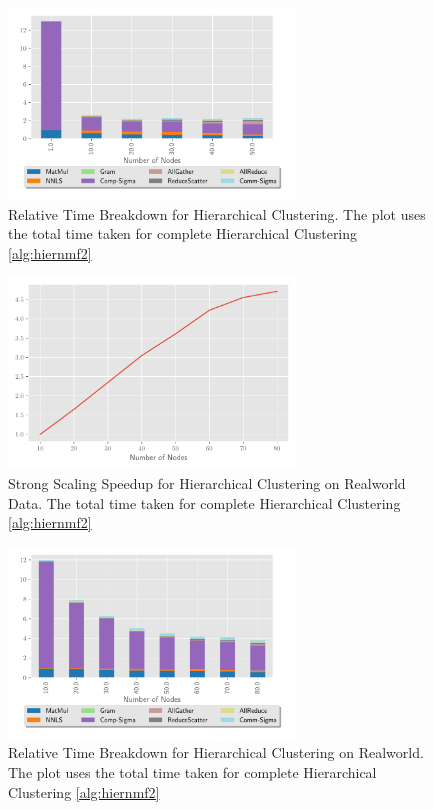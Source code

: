 \documentclass[conference,compsoc]{IEEEtran}
\begin{document}
\begin{figure}
\begin{center}
\includegraphics[height=2in, width=\columnwidth]{plots/synthetic_hier_strongscaling.pdf}
\caption{Relative Time Breakdown for Hierarchical Clustering. The plot uses the total time taken for complete Hierarchical Clustering \cref{alg:hiernmf2}}
\label{fig:synhierstrongscaling}
\end{center}
\end{figure}

\begin{figure}
\begin{center}
\includegraphics[height=2in, width=\columnwidth]{plots/realworld_hierarchical_speedup.pdf}
\caption{Strong Scaling Speedup for Hierarchical Clustering on Realworld Data. The total time taken for complete Hierarchical Clustering \cref{alg:hiernmf2}}
\label{fig:rwhierspeedup}
\end{center}
\end{figure}

\begin{figure}
\begin{center}
\includegraphics[height=2in, width=\columnwidth]{plots/realworld_hier_strongscaling.pdf}
\caption{Relative Time Breakdown for Hierarchical Clustering on Realworld. The plot uses the total time taken for complete Hierarchical Clustering \cref{alg:hiernmf2}}
\label{fig:rwhierstrongscaling}
\end{center}
\end{figure}
\end{document}
